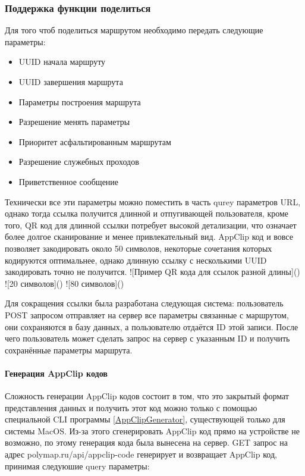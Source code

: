   \subsubsection{Поддержка функции поделиться}
    Для того чтоб поделиться маршрутом необходимо передать следующие параметры:
    \begin{itemize}
      \item UUID начала маршруту
      \item UUID завершения маршрута
      \item Параметры построения маршрута
      \item Разрешение менять параметры
      \item Приоритет асфальтированным маршрутам
      \item Разрешение служебных проходов
      \item Приветственное сообщение
    \end{itemize}

    Технически все эти параметры можно поместить в часть qurey параметров URL, однако тогда ссылка получится длинной и отпугивающей пользователя, кроме того, QR код для длинной ссылки потребует высокой детализации, что означает более долгое сканирование и менее привлекательный вид. AppClip код и вовсе позволяет закодировать около 50 символов, некоторые сочетания которых кодируются оптимальнее, однако длинную ссылку с несколькими UUID закодировать точно не получится.
    ![Пример QR кода для ссылок разной длины]()
    ![20 символов]()
    ![80 символов]()

    Для сокращения ссылки была разработана следующая система: пользователь POST запросом отправляет на сервер все параметры связанные с маршрутом, они сохраняются в базу данных, а пользователю отдаётся ID этой записи. После чего пользователь может сделать запрос на сервер с указанным ID и получить сохранённые параметры маршрута.

    \paragraph{Генерация AppClip кодов}
      Сложность генерации AppClip кодов состоит в том, что это закрытый формат представления данных и получить этот код можно только с помощью специальной CLI программы \ref{AppClipGenerator}, существующей только для системы MacOS. Из-за этого сгенерировать AppClip код прямо на устройстве не возможно, по этому генерация кода была вынесена на сервер. GET запрос на адрес polymap.ru/api/appclip-code генерирует и возвращает AppClip код, принимая следуюшие query параметры:

